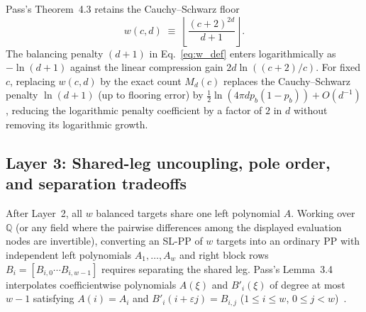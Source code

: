 \documentclass[11pt,a4paper]{article}
\theoremstyle{plain}
\theoremstyle{definition}
\theoremstyle{remark}
\newcommand{\Q}{\mathbb{Q}}
\begin{document}
Pass's Theorem~4.3 retains the Cauchy--Schwarz floor
\begin{equation}
    w(c, d) \;\equiv\; \left\lfloor \frac{(c + 2)^{2d}}{d + 1} \right\rfloor .
    \label{eq:w_def}
\end{equation}
The balancing penalty $(d + 1)$ in Eq.~\eqref{eq:w_def} enters logarithmically as $-\ln(d + 1)$ against the linear compression gain $2d\ln((c + 2)/c)$. For fixed $c$, replacing $w(c, d)$ by the exact count $M_d(c)$ replaces the Cauchy--Schwarz penalty $\ln(d + 1)$ (up to flooring error) by $\frac{1}{2}\ln(4\pi d p_b(1 - p_b)) + O(d^{-1})$, reducing the logarithmic penalty coefficient by a factor of $2$ in $d$ without removing its logarithmic growth.

\subsection{Layer 3: Shared-leg uncoupling, pole order, and separation tradeoffs}
\label{subsec:layer3}

After Layer~2, all $w$ balanced targets share one left polynomial $A$. Working over $\Q$ (or any field where the pairwise differences among the displayed evaluation nodes are invertible), converting an SL-PP of $w$ targets into an ordinary PP with independent left polynomials $A_1, \dots, A_w$ and right block rows $B_i = [B_{i,0} \cdots B_{i,w-1}]$ requires separating the shared leg. Pass's Lemma~3.4 interpolates coefficientwise polynomials $A(\xi)$ and $B'_i(\xi)$ of degree at most $w - 1$ satisfying $A(i) = A_i$ and $B'_i(i + \varepsilon j) = B_{i,j}$ ($1 \le i \le w$, $0 \le j < w$)~\cite{Pass2026}.
\end{document}
